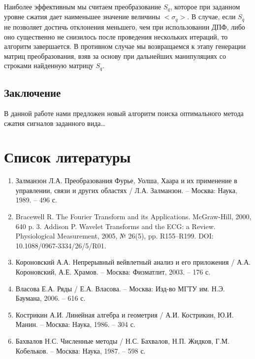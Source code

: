 \documentclass[11pt, oneside, a4paper]{article}
\begin{document}
Наиболее эффективным мы считаем преобразование $S_q$, которое при заданном уровне сжатия дает наименьшее значение величины $<\sigma_q>$. В случае, если $S_q$ не позволяет достичь отклонения  меньшего, чем при использовании ДПФ, либо оно существенно не снизилось после проведения нескольких итераций, то алгоритм завершается. В противном случае мы возвращаемся к этапу генерации матриц преобразования, взяв за основу при дальнейших манипуляциях со строками найденную матрицу $S_q$.

\subsection{Заключение}

В данной работе нами предложен новый алгоритм поиска оптимального метода сжатия сигналов заданного вида…

\section{Список литературы}

\begin{enumerate} 
\item Залманзон Л.А. Преобразования Фурье, Уолша, Хаара и их применение в управлении, связи и других областях / Л.А. Залманзон. – Москва: Наука, 1989. – 496 с.
\item Bracewell R. The Fourier Transform and its Applications. McGraw-Hill, 2000, 640 p.
3. Addison P. Wavelet Transforms and the ECG: a Review. Physiological Measurement, 2005, № 26(5), pp. R155–R199. DOI: 10.1088/0967-3334/26/5/R01.
\item Короновский А.А. Непрерывный вейвлетный анализ и его приложения / А.А. Короновский, А.Е. Храмов. – Москва: Физматлит, 2003. – 176 с.
\item Власова Е.А. Ряды / Е.А. Власова. – Москва: Изд-во МГТУ им. Н.Э. Баумана, 2006. – 616 с.
\item Кострикин А.И. Линейная алгебра и геометрия / А.И. Кострикин, Ю.И. Манин. – Москва: Наука, 1986. – 304 с.
\item Бахвалов Н.С. Численные методы / Н.С. Бахвалов, Н.П. Жидков, Г.М. Кобельков. – Москва: Наука, 1987. – 598 с.
\end{enumerate}
\end{document}
